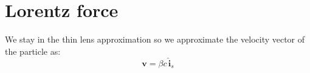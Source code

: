 \documentclass[a4paper,12pt]{report}
\begin{document}
%
%
%
%
%
%
%
%


\section{Lorentz force}


We stay in the thin lens approximation so we approximate the velocity vector of the particle as:
\begin{equation}
\textbf{v} = \beta c\, \hat{\textbf{i}}_s
\end{equation}
\end{document}
